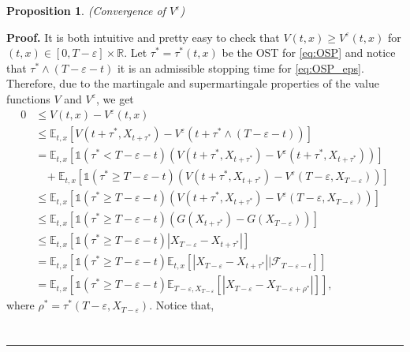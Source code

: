 \documentclass{tufte-handout}
\newcommand{\E}{\mathbb{E}} %
\newcommand{\R}{\mathbb{R}} %
\newtheorem{pr}{Proposition}
\newenvironment{pf}[1][Proof]{\textbf{#1.} }{\ \rule{0.5em}{0.5em}}
\begin{document}
	\begin{pr}(Convergence of $V^\varepsilon$) \\

	\end{pr}

	\begin{pf}
		It is both intuitive and pretty easy to check that $V(t, x) \geq V^\varepsilon(t, x)$ for $(t, x) \in [0, T - \varepsilon]\times\R$. Let $\tau^* = \tau^*(t, x)$ be the OST for \eqref{eq:OSP} and notice that $\tau^*\wedge(T - \varepsilon - t)$ it is an admissible stopping time for \eqref{eq:OSP_eps}. Therefore, due to the martingale and supermartingale properties of the value functions $V$ and $V^{\varepsilon}$, we get
		\begin{align*}
			0 &\leq V(t, x) - V^\varepsilon(t, x) \\
			&\leq \E_{t, x}\left[V(t + \tau^*, X_{t + \tau^*}) - V^\varepsilon(t + \tau^*\wedge(T - \varepsilon - t))\right] \\
			&= \E_{t, x}\left[\mathbb{1}(\tau^* < T - \varepsilon - t)\left(V(t + \tau^*, X_{t + \tau^*}) - V^\varepsilon(t + \tau^*, X_{t + \tau^*})\right)\right] \\
			&\ \ \ \ + \E_{t, x}\left[\mathbb{1}(\tau^* \geq T - \varepsilon - t)\left(V(t + \tau^*, X_{t + \tau^*}) - V^\varepsilon(T - \varepsilon, X_{T - \varepsilon})\right)\right] \\
			&\leq \E_{t, x}\left[\mathbb{1}(\tau^* \geq T - \varepsilon - t)\left(V(t + \tau^*, X_{t + \tau^*}) - V^\varepsilon(T - \varepsilon, X_{T - \varepsilon})\right)\right] \\ 
			&\leq \E_{t, x}\left[\mathbb{1}(\tau^* \geq T - \varepsilon - t)\left(G(X_{t + \tau^*}) - G(X_{T - \varepsilon})\right)\right] \\
			&\leq \E_{t, x}\left[\mathbb{1}(\tau^* \geq T - \varepsilon - t)\left|X_{T - \varepsilon} - X_{t + \tau^*}\right|\right] \\
			&= \E_{t, x}\left[\mathbb{1}(\tau^* \geq T - \varepsilon - t)\E_{t, x}\left[\left|X_{T - \varepsilon} - X_{t + \tau^*}\right|\Big|\mathcal{F}_{T - \varepsilon - t}\right]\right] \\
			&= \E_{t, x}\left[\mathbb{1}(\tau^* \geq T - \varepsilon - t)\E_{T - \varepsilon, X_{T - \varepsilon}}\left[\left|X_{T - \varepsilon} - X_{T - \varepsilon + \rho^*}\right|\right]\right],
		\end{align*}
		where $\rho^* = \tau^*(T - \varepsilon, X_{T - \varepsilon})$. Notice that,
		\begin{align*}

\end{align*}
\end{pf}
\end{document}
